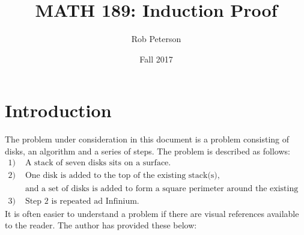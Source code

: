\documentclass[11pt]{article}
\begin{document}
	\thispagestyle{empty}
	\title{MATH 189: Induction Proof}
	\author{Rob Peterson}
	\date{Fall 2017}
	\maketitle

	\newpage %


	\section{Introduction}
		The problem under consideration in this document is a problem consisting of disks, an algorithm and a series of steps.  
		The problem is described as follows:\
		\begin{align*}
			1) &\text{ A stack of seven disks sits on a surface.}\\
			2) &\text{ One disk is added to the top of the existing stack(s),} \\
		    	    &\text{ and a set of disks is added to form a square perimeter around the existing stack(s).}\\
			3) &\text{ Step 2 is repeated ad Infinium.}
		\end{align*}	
		It is often easier to understand a problem if there are visual references available to the reader.  The author has provided these below:\
\end{document}
